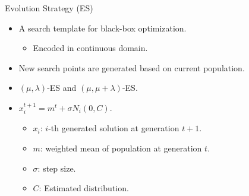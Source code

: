 \begin{frame}{Evolution Strategy (ES)}
  \begin{itemize}
    \item A search template for black-box optimization.
      \begin{itemize}
        \item Encoded in continuous domain.
      \end{itemize}
      \vspace*{14pt}
    \item New search points are generated based on current population.
      \vspace*{14pt}
    \item $(\mu,\lambda)$-ES and $(\mu,\mu+\lambda)$-ES.
      \vspace*{14pt}
    \item $x_i^{t+1} = m^t + \sigma N_i(0,C)$.
      \begin{itemize}
        \item $x_i$: $i$-th generated solution at generation $t+1$.
        \item $m$: weighted mean of population at generation $t$.
        \item $\sigma$: step size.
        \item $C$: Estimated distribution.
      \end{itemize}
  \end{itemize}
\end{frame}

